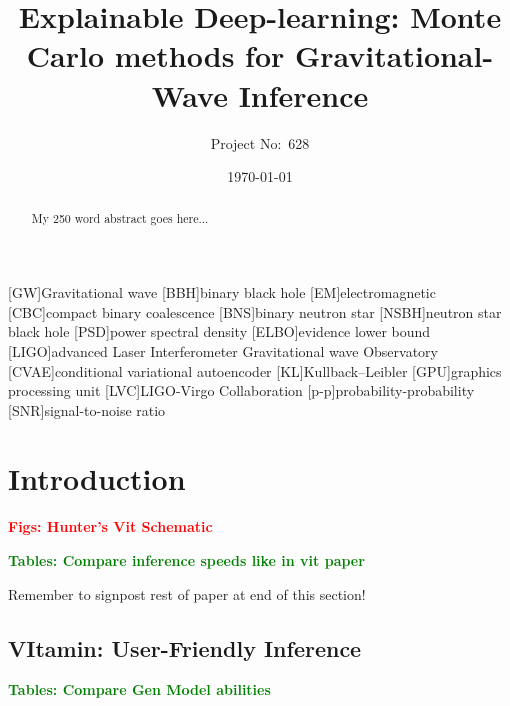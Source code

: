\documentclass[aps,superscriptaddress,twocolumn,nopreprintnumbers,floatfix,groupedaddress]{revtex4-1}
\newcommand{\vitamin}{{\sc VItamin}\xspace}
\begin{document}
\title{Explainable Deep-learning: Monte Carlo methods for Gravitational-Wave Inference}

\author{Project No:~628}
%

\date{\today}

\begin{abstract}
My 250 word abstract goes here...
\end{abstract}

\maketitle

[GW]{Gravitational wave}
[BBH]{binary black hole}
[EM]{electromagnetic}
[CBC]{compact binary coalescence}
[BNS]{binary neutron star}
[NSBH]{neutron star black hole}
[PSD]{power spectral density}
[ELBO]{evidence lower bound}
[LIGO]{advanced Laser Interferometer Gravitational wave Observatory}
[CVAE]{conditional variational autoencoder}
[KL]{Kullback--Leibler}
[GPU]{graphics processing unit}
[LVC]{LIGO-Virgo Collaboration}
[p-p]{probability-probability}
[SNR]{signal-to-noise ratio}

\section{Introduction}\label{intro}

\textbf{\textcolor{red}{Figs: Hunter's Vit Schematic}}

\textbf{\textcolor{green}{Tables: Compare inference speeds like in vit paper}}

Remember to signpost rest of paper at end of this section!

%
\subsection{\vitamin: User-Friendly Inference}\label{vit}

\textbf{\textcolor{green}{Tables: Compare Gen Model abilities}}
\end{document}

